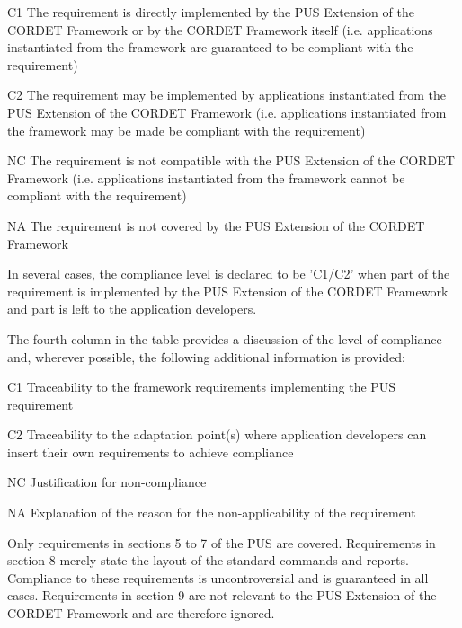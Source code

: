 \documentclass[a4paper,10pt]{article}
\newenvironment{fw_itemize}						%
{\begin{itemize}
  \setlength{\itemsep}{1mm}
  \setlength{\parskip}{0pt}
  \setlength{\parsep}{0pt}}
{\end{itemize}}
\begin{document}
\begin{fw_itemize}
\item [C1] The requirement is directly implemented by the PUS Extension of the CORDET Framework or by the CORDET Framework itself (i.e. applications instantiated from the framework are guaranteed to be compliant with the requirement)
\item [C2] The requirement may be implemented by applications instantiated from the PUS Extension of the CORDET Framework (i.e. applications instantiated from the framework may be made be compliant with the requirement)
\item [NC] The requirement is not compatible with the PUS Extension of the CORDET Framework (i.e. applications instantiated from the framework cannot be compliant with the requirement)
\item [NA] The requirement is not covered by the PUS Extension of the CORDET Framework
\end{fw_itemize}

In several cases, the compliance level is declared to be 'C1/C2' when part of the requirement is implemented by the PUS Extension of the CORDET Framework and part is left to the application developers.

The fourth column in the table provides a discussion of the level of compliance and, wherever possible, the following additional information is provided:

\begin{fw_itemize}
\item [C1] Traceability to the framework requirements implementing the PUS requirement 
\item [C2] Traceability to the adaptation point(s) where application developers can insert their own requirements to achieve compliance
\item [NC] Justification for non-compliance
\item [NA] Explanation of the reason for the non-applicability of the requirement
\end{fw_itemize}

Only requirements in sections 5 to 7 of the PUS are covered. Requirements in section 8 merely state the layout of the standard commands and reports. Compliance to these requirements is uncontroversial and is guaranteed in all cases. Requirements in section 9 are not relevant to the PUS Extension of the CORDET Framework and are therefore ignored.
\end{document}
